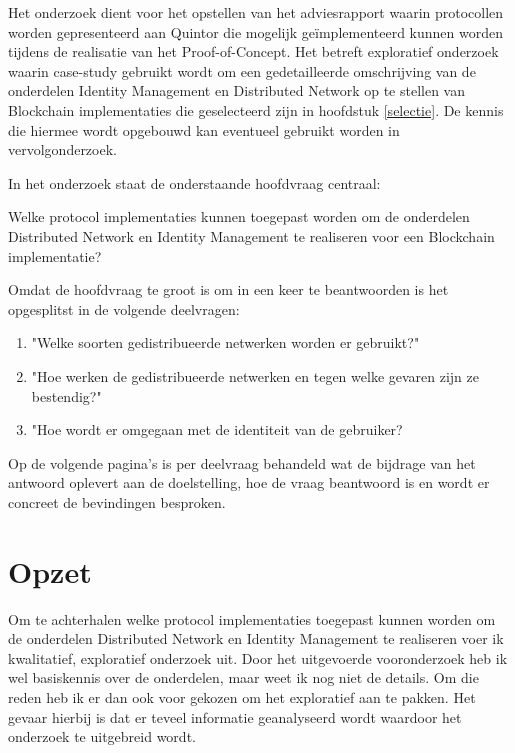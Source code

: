 Het onderzoek dient voor het opstellen van het adviesrapport waarin protocollen worden  gepresenteerd  aan Quintor die mogelijk geïmplementeerd kunnen worden tijdens de realisatie van het Proof-of-Concept. Het betreft exploratief onderzoek waarin case-study gebruikt wordt om een gedetailleerde omschrijving van de onderdelen Identity Management en Distributed Network op te stellen van Blockchain implementaties die geselecteerd zijn in hoofdstuk \ref{selectie}. De kennis die hiermee wordt opgebouwd kan eventueel gebruikt worden in vervolgonderzoek.

In het onderzoek staat de onderstaande hoofdvraag centraal:
\begin{formal}
  Welke protocol implementaties kunnen toegepast worden om de onderdelen Distributed Network en Identity Management te realiseren voor een Blockchain implementatie?
\end{formal}

Omdat de hoofdvraag te groot is om in een keer te beantwoorden is het opgesplitst in de volgende deelvragen:

\begin{enumerate}[noitemsep]
  \item "Welke soorten gedistribueerde netwerken worden er gebruikt?"
  \item "Hoe werken de gedistribueerde netwerken en tegen welke gevaren zijn ze bestendig?"
  \item "Hoe wordt er omgegaan met de identiteit van de gebruiker?
\end{enumerate}

Op de volgende pagina's is per deelvraag behandeld wat de bijdrage van het antwoord oplevert aan de doelstelling, hoe de vraag beantwoord is en wordt er concreet de bevindingen besproken.

\clearpage
\section{Opzet}

Om te achterhalen welke protocol implementaties toegepast kunnen worden om de onderdelen Distributed Network en Identity Management te realiseren voer ik kwalitatief, exploratief onderzoek uit. Door het uitgevoerde vooronderzoek heb ik wel basiskennis over de onderdelen, maar weet ik nog niet de details. Om die reden heb ik er dan ook voor gekozen om het exploratief aan te pakken. Het gevaar hierbij is dat er teveel informatie geanalyseerd wordt waardoor het onderzoek te uitgebreid wordt.

